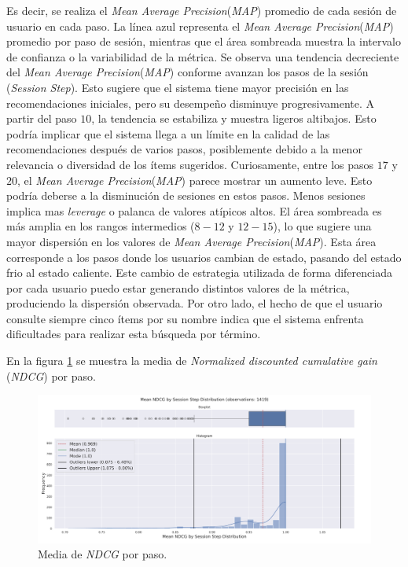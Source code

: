 \documentclass[11pt,a4paper,twoside]{thesis}
\begin{document}
Es decir, se realiza el \textit{Mean Average Precision}(\textit{MAP}) promedio de cada sesión de usuario en cada paso. La línea azul representa el \textit{Mean Average Precision}(\textit{MAP}) promedio por paso de sesión, mientras que el área sombreada muestra la intervalo de confianza o la variabilidad de la métrica. Se observa una tendencia decreciente del \textit{Mean Average Precision}(\textit{MAP}) conforme avanzan los pasos de la sesión (\textit{Session Step}). Esto sugiere que el sistema tiene mayor precisión en las recomendaciones iniciales, pero su desempeño disminuye progresivamente. A partir del paso $10$, la tendencia se estabiliza y muestra ligeros altibajos.
Esto podría implicar que el sistema llega a un límite en la calidad de las recomendaciones después de varios pasos, posiblemente debido a la menor relevancia o diversidad de los ítems sugeridos. Curiosamente, entre los pasos $17$ y $20$, el \textit{Mean Average Precision}(\textit{MAP}) parece mostrar un aumento leve. Esto podría deberse a la disminución de sesiones en estos pasos. Menos sesiones implica mas \textit{leverage} o palanca de valores atípicos altos. El área sombreada es más amplia en los rangos intermedios ($8-12$ y $12-15$), lo que sugiere una mayor dispersión en los valores de \textit{Mean Average Precision}(\textit{MAP}). Esta área corresponde a los pasos donde los usuarios cambian de estado, pasando del estado frio al estado caliente. Este cambio de estrategia utilizada de forma diferenciada por cada usuario puedo estar generando distintos valores de la métrica, produciendo la dispersión observada. Por otro lado, el hecho de que el usuario consulte siempre cinco ítems por su nombre indica que el sistema enfrenta dificultades para realizar esta búsqueda por término.

\clearpage

En la figura \ref{fig:llama2-mean_ndcg_by_session_step_distribution} se muestra la media de \textit{Normalized discounted cumulative gain} (\textit{NDCG}) por paso.

\begin{figure}[htbp]
	\centering
	\includegraphics[width=15cm]{./images/llama2/mean_ndcg_by_session_step_distribution.png}
	\caption{Media de \textit{NDCG} por paso.}
	\label{fig:llama2-mean_ndcg_by_session_step_distribution}
\end{figure}
\end{document}
